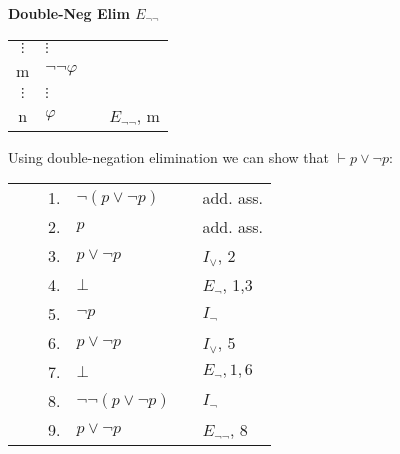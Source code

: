 \documentclass[nobib,nofonts]{tufte-handout}
\begin{document}
\bigskip
\noindent \colorbox{mygray!60}{\centering
  \begin{minipage}[t]{0.35\linewidth}
    \textbf{Double-Neg Elim $E_{\neg\neg}$}
  \end{minipage}
  \begin{minipage}[t]{0.55\linewidth}
    \begin{tabular}{clcl}
            $\vdots$ & $\vdots$  & \\
      m              & $\neg \neg \varphi$ &  \\
            $\vdots$ & $\vdots$  & \\
      n              & $\varphi$    & & $E_{\neg \neg}$, m
    \end{tabular}
  \end{minipage}
}
\bigskip

Using double-negation elimination we can show that $\vdash p \vee \neg p$:\bigskip

\begin{tabular}{ccclcl}
 \cline{1-3}\vline  &         & 1. & $\neg (p \vee \neg p)$      & & add. ass.  \\
 \vline             &         & 2. & $p$                         & & add. ass.  \\
 \cline{2-3} \vline &  \vline & 3. & $p \vee \neg p$             & & $I_{\vee}$, 2  \\
 \vline             &  \vline & 4. & $\bot$                      & & $E_{\neg}$, 1,3 \\
 \cline{2-6} \vline &         & 5. & $\neg p$                    & & $I_{\neg}$\\
 \vline             &         & 6. & $p \vee \neg p $            & & $I_{\vee}$, 5 \\
 \vline             &         & 7. & $\bot$                      & & $E_{\neg}, 1, 6$  \\ \hline
                    &         & 8. & $\neg \neg (p \vee \neg p)$ & & $I_{\neg}$\\
                    &         & 9. & $p \vee \neg p$             & & $E_{\neg\neg}$, 8 \\
\end{tabular}
\end{document}
